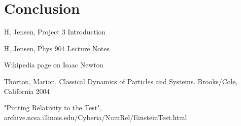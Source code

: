 \documentclass[12pt,righttag]{article}
\begin{document}
	
\section{Conclusion}



 
\begin{thebibliography}{9}
	H, Jensen, Project 3 Introduction
	
	H, Jensen, Phys 904 Lecture Notes
	
	Wikipedia page on Isaac Newton
	
Thorton, Marion, Classical Dynamics of Particles and Systems. Brooks/Cole, California 2004
	
"Putting Relativity to the Test", archive.ncsa.illinois.edu/Cyberia/NumRel/EinsteinTest.html
	
\end{thebibliography}
\end{document}
